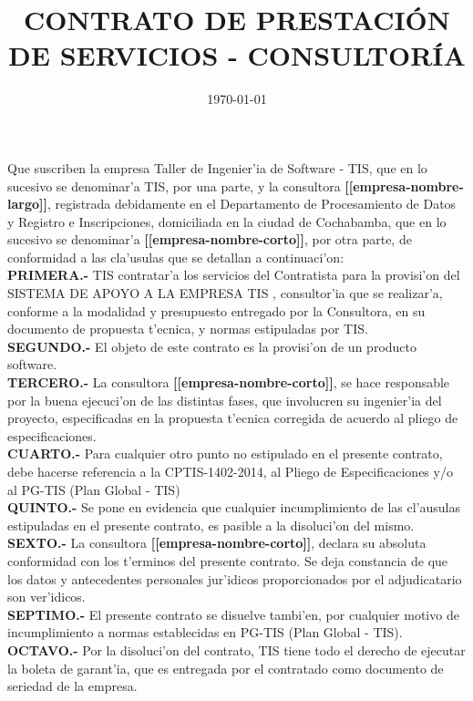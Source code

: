 \documentclass{article}
\newcommand{\sistema}[0]{SISTEMA DE APOYO A LA EMPRESA TIS }
\newcommand{\convocatoria}[0]{CPTIS-1402-2014}
\newcommand{\empresa}[0]{\textbf{[[empresa-nombre-corto]]}}
\newcommand{\empresaL}[0]{\textbf{[[empresa-nombre-largo]]}}
\begin{document}
\title{\bf{CONTRATO DE PRESTACI\'ON DE SERVICIOS - CONSULTOR\'IA}}
\date{\today}

\maketitle

Que suscriben la empresa Taller de Ingenier'ia de Software - TIS, que en lo sucesivo se denominar'a TIS, por una parte, y la consultora  \empresaL, registrada debidamente en el Departamento de Procesamiento de Datos y Registro e Inscripciones, domiciliada en la ciudad de Cochabamba, que en lo sucesivo se denominar'a \empresa, por otra parte, de conformidad a las cla'usulas que se detallan a continuaci'on:
\\
{\bf{PRIMERA.-}} TIS contratar'a los servicios del Contratista para la provisi'on del \sistema, consultor'ia que se realizar'a, conforme a la modalidad y  presupuesto entregado por la Consultora, en su documento de propuesta t'ecnica, y normas estipuladas por TIS.
\\
{\bf{SEGUNDO.-}} El objeto de este contrato  es la provisi'on de un producto software.
\\
{\bf{TERCERO.-}} La consultora \empresa,  se hace responsable por la buena ejecuci'on de las distintas fases, que involucren su ingenier'ia del proyecto, especificadas en la propuesta t'ecnica corregida de acuerdo al pliego de especificaciones.
\\
{\bf{CUARTO.-}} Para cualquier otro punto no estipulado en el presente contrato, debe hacerse referencia a la \convocatoria, al Pliego de Especificaciones y/o al PG-TIS (Plan Global - TIS)
\\
{\bf{QUINTO.-}} Se pone en evidencia que cualquier incumplimiento de las cl'ausulas estipuladas en el presente contrato, es pasible a la disoluci'on del mismo.
\\
{\bf{SEXTO.-}} La consultora \empresa,  declara su absoluta conformidad con los t'erminos del presente contrato. Se deja constancia de que los datos y antecedentes personales jur'idicos proporcionados por el adjudicatario son ver'idicos.
\\
{\bf{SEPTIMO.-}} El presente contrato se disuelve tambi'en, por cualquier motivo de incumplimiento a normas establecidas en PG-TIS (Plan Global - TIS).
\\
{\bf{OCTAVO.-}} Por la disoluci'on del contrato, TIS tiene todo el derecho de ejecutar la boleta de garant'ia, que es entregada por el contratado como documento de seriedad de la empresa.
\end{document}
